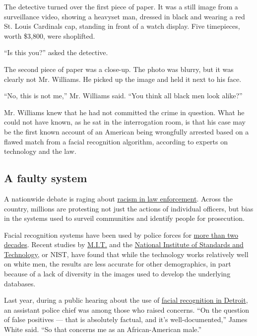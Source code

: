 The detective turned over the first piece of paper. It was a still image
from a surveillance video, showing a heavyset man, dressed in black and
wearing a red St. Louis Cardinals cap, standing in front of a watch
display. Five timepieces, worth \$3,800, were shoplifted.

``Is this you?'' asked the detective.

The second piece of paper was a close-up. The photo was blurry, but it
was clearly not Mr. Williams. He picked up the image and held it next to
his face.

``No, this is not me,'' Mr. Williams said. ``You think all black men
look alike?''

Mr. Williams knew that he had not committed the crime in question. What
he could not have known, as he sat in the interrogation room, is that
his case may be the first known account of an American being wrongfully
arrested based on a flawed match from a facial recognition algorithm,
according to experts on technology and the law.

\hypertarget{a-faulty-system}{%
\subsection{A faulty system}\label{a-faulty-system}}

A nationwide debate is raging about
\href{https://www.nytimes.com/news-event/george-floyd-protests-minneapolis-new-york-los-angeles}{racism
in law enforcement}. Across the country, millions are protesting not
just the actions of individual officers, but bias in the systems used to
surveil communities and identify people for prosecution.

Facial recognition systems have been used by police forces for
\href{https://www.nytimes.com/2020/01/12/technology/facial-recognition-police.html}{more
than two decades}. Recent studies by
\href{https://www.nytimes.com/2018/02/09/technology/facial-recognition-race-artificial-intelligence.html}{M.I.T.}
and the
\href{https://www.nytimes.com/2019/12/19/technology/facial-recognition-bias.html}{National
Institute of Standards and Technology}, or NIST, have found that while
the technology works relatively well on white men, the results are less
accurate for other demographics, in part because of a lack of diversity
in the images used to develop the underlying databases.

Last year, during a public hearing about the use of
\href{https://www.nytimes.com/2019/07/08/us/detroit-facial-recognition-cameras.html}{facial
recognition in Detroit}, an assistant police chief was among those who
raised concerns. ``On the question of false positives --- that is
absolutely factual, and it's well-documented,'' James White said. ``So
that concerns me as an African-American male.''

